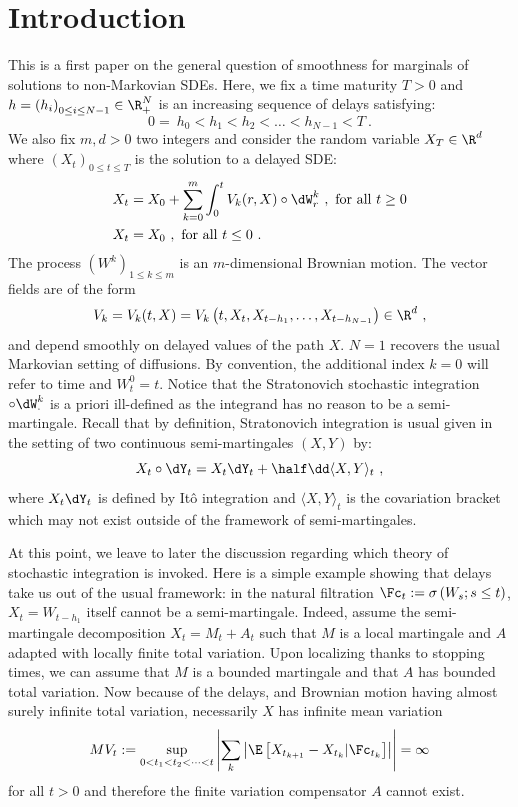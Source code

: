 \section{Introduction}

This is a first paper on the general question of smoothness for marginals of solutions to non-Markovian SDEs. Here, we fix a time maturity $T>0$ and $h = \left(h_i \right)_{0 \leq i \leq N-1} \in \R_+^N$ is an increasing sequence of delays satisfying:
\begin{equation}\label{eq:delays}
0 = \ h_0 < h_1 < h_2 < \dots < h_{N-1} < T \ .
\end{equation}
We also fix $m,d>0$ two integers and consider the random variable $X_T \in \R^d$ where $\left(X_t \right)_{0 \leq t \leq T}$ is the solution to a delayed SDE:
\begin{align}\label{eq:sde_def}
X_t & = X_0 + \sum_{k=0}^m \int_0^t V_k(r,X) \circ \dW^k_r \ , \text{ for all }t\geq 0\\
X_t & = X_0 \ ,\text{ for all }t\leq 0 \ .
\end{align}
The process $(W^k)_{1\leq k\leq m}$ is an $m$-dimensional Brownian motion. The vector fields are of the form
\[
V_k = V_k(t,X) = V_k\left(t, X_{t},X_{t-h_1},\dots, X_{t-h_{N-1}} \right) \in \R^d \ ,
\]
and depend smoothly on delayed values of the path $X$. $N=1$ recovers the usual Markovian setting of diffusions. By convention, the additional index $k=0$ will refer to time and $W_t^0=t$. Notice that the Stratonovich stochastic integration $\circ \dW^k_\cdot$ is a priori ill-defined as the integrand has no reason to be a semi-martingale. Recall that by definition, Stratonovich integration is usual given in the setting of two continuous semi-martingales $(X,Y)$ by:
\[
X_t \circ \dY_t = X_t \dY_t + \half \dd \langle X, Y \rangle_t \ ,
\]
where $X_t \dY_t$ is defined by Itô integration and $\langle X, Y \rangle_t$ is the covariation bracket which may not exist outside of the framework of semi-martingales.

At this point, we leave to later the discussion regarding which theory of stochastic integration is invoked. Here is a simple example showing that delays take us out of the usual framework: in the natural filtration $\Fc_t := \sigma\left(W_s ; s \leq t \right)$, $X_t = W_{t-h_1}$ itself cannot be a semi-martingale. Indeed, assume the semi-martingale decomposition $X_t = M_t + A_t$ such that $M$ is a local martingale and $A$ adapted with locally finite total variation. Upon localizing thanks to stopping times, we can assume that $M$ is a bounded martingale and that $A$ has bounded total variation. Now because of the delays, and Brownian motion having almost surely infinite total variation, necessarily $X$ has infinite mean variation
\[
MV_t := \sup_{0 < t_1 < t_2 < \dots < t}
\left| \sum_k \left|\E \left[X_{t_{k+1}} - X_{t_{k}}| \Fc_{t_k} \right]\right| \right|
= \infty
\]
for all $t>0$ and therefore the finite variation compensator $A$ cannot exist.

